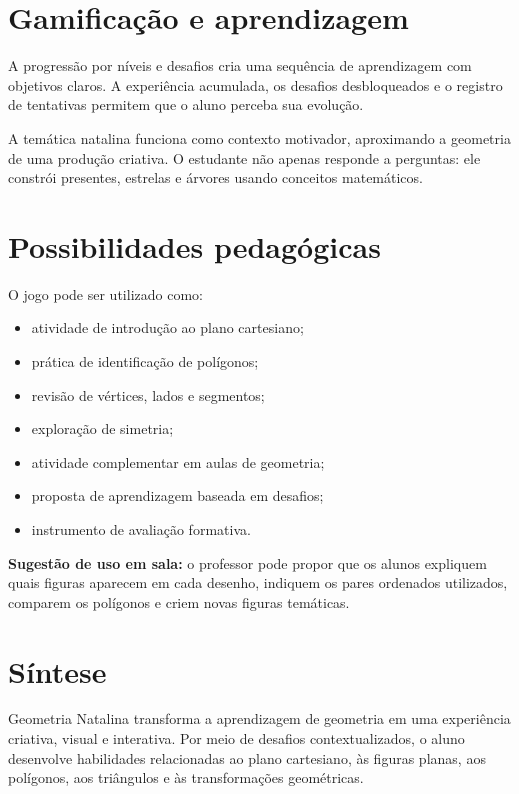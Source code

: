 \documentclass[11pt,a4paper]{article}
\begin{document}
\section*{Gamificação e aprendizagem}

A progressão por níveis e desafios cria uma sequência de aprendizagem com objetivos claros. A experiência acumulada, os desafios desbloqueados e o registro de tentativas permitem que o aluno perceba sua evolução.

A temática natalina funciona como contexto motivador, aproximando a geometria de uma produção criativa. O estudante não apenas responde a perguntas: ele constrói presentes, estrelas e árvores usando conceitos matemáticos.

\section*{Possibilidades pedagógicas}

O jogo pode ser utilizado como:

\begin{itemize}
  \item atividade de introdução ao plano cartesiano;
  \item prática de identificação de polígonos;
  \item revisão de vértices, lados e segmentos;
  \item exploração de simetria;
  \item atividade complementar em aulas de geometria;
  \item proposta de aprendizagem baseada em desafios;
  \item instrumento de avaliação formativa.
\end{itemize}

\begin{missionbox}
\textbf{Sugestão de uso em sala:} o professor pode propor que os alunos expliquem quais figuras aparecem em cada desenho, indiquem os pares ordenados utilizados, comparem os polígonos e criem novas figuras temáticas.
\end{missionbox}

\section*{Síntese}

Geometria Natalina transforma a aprendizagem de geometria em uma experiência criativa, visual e interativa. Por meio de desafios contextualizados, o aluno desenvolve habilidades relacionadas ao plano cartesiano, às figuras planas, aos polígonos, aos triângulos e às transformações geométricas.
\end{document}
